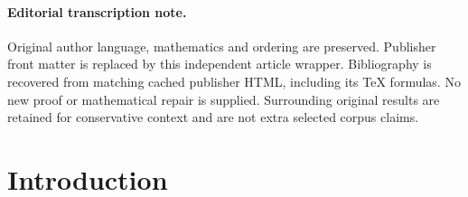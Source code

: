 \documentclass[11pt]{article}
\numberwithin{equation}{section}
\theoremstyle{plain}
\theoremstyle{remark}
\begin{document}
\paragraph{Editorial transcription note.}
Original author language, mathematics and ordering are preserved. Publisher front matter is replaced by this independent article wrapper. Bibliography is recovered from matching cached publisher HTML, including its TeX formulas. No new proof or mathematical repair is supplied. Surrounding original results are retained for conservative context and are not extra selected corpus claims.
\clearpage

\section{Introduction}
\end{document}
